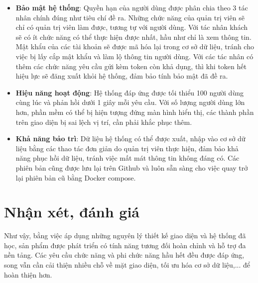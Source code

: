 \documentclass[./../main.tex]{subfiles}
\begin{document}
\begin{itemize}
    \item \textbf{Bảo mật hệ thống}: Quyền hạn của người dùng được phân chia theo 3 tác nhân chính đúng như tiêu chí đề ra. Những chức năng của quản trị viên sẽ chỉ có quản trị viên làm được, tương tự với người dùng. Với tác nhân khách sẽ có ít chức năng có thể thực hiện được nhất, hầu như chỉ là xem thông tin. Mật khẩu của các tài khoản sẽ được mã hóa lại trong cơ sở dữ liệu, tránh cho việc bị lấy cắp mật khẩu và làm lộ thông tin người dùng. Với các tác nhân có thêm các chức năng yêu cầu gửi kèm token còn khả dụng, thì khi token hết hiệu lực sẽ đăng xuất khỏi hệ thống, đảm bảo tính bảo mật đã đề ra.
    \item \textbf{Hiệu năng hoạt động}: Hệ thống đáp ứng được tối thiểu 100 người dùng cùng lúc và phản hồi dưới 1 giây mỗi yêu cầu. Với số lượng người dùng lớn hơn, phần mềm có thể bị hiện tượng đứng màn hình hiển thị, các thành phần trên giao diện bị sai lệch vị trí, cần phải khắc phục thêm.
    \item \textbf{Khả năng bảo trì}: Dữ liệu hệ thống có thể được xuất, nhập vào cơ sở dữ liệu bằng các thao tác đơn giản do quản trị viên thực hiện, đảm bảo khả năng phục hồi dữ liệu, tránh việc mất mát thông tin không đáng có. Các phiên bản cũng được lưu lại trên Github và luôn sẵn sàng cho việc quay trở lại phiên bản cũ bằng Docker compose.
\end{itemize}

\section{Nhận xét, đánh giá}
Như vậy, bằng việc áp dụng những nguyên lý thiết kế giao diện và hệ thống đã học, sản phẩm được phát triển có tính năng tương đối hoàn chỉnh và hỗ trợ đa nền tảng. Các yêu cầu chức năng và phi chức năng hầu hết đều được đáp ứng, song vẫn cần cải thiện nhiều chỗ về mặt giao diện, tối ưu hóa cơ sở dữ liệu,... để hoàn thiện hơn.
\end{document}
